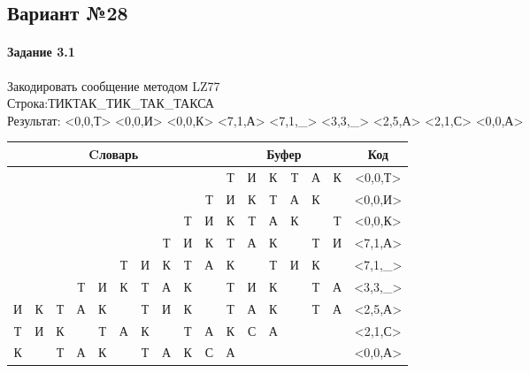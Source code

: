 \documentclass[a4paper, 12pt]{article}
\begin{document}
\pagebreak
\subsection{Вариант №28}
\paragraph{Задание 3.1}

Закодировать сообщение методом LZ77\\
Строка:ТИКТАК\_ТИК\_ТАК\_ТАКСА\\
Результат: <0,0,Т> <0,0,И> <0,0,К> <7,1,А> <7,1,\_> <3,3,\_> <2,5,А> <2,1,С> <0,0,А>\\
\begin{table}[h!]
\centering
\begin{tabular}{|c|c|c|c|c|c|c|c|c|c|c|c|c|c|c|c|c|} 
\hline
\multicolumn{10}{|c|}{Cловарь} & \multicolumn{6}{c|}{Буфер} & Код  \\ \hline
  &   &   &   &   &   &   &   &   &   & \cellcolor[HTML]{8CE4F6} Т & И & К & Т & А & К & <0,0,Т>
\\ \hline
  &   &   &   &   &   &   &   &   & Т & \cellcolor[HTML]{8CE4F6} И & К & Т & А & К &   & <0,0,И>
\\ \hline
  &   &   &   &   &   &   &   & Т & И & \cellcolor[HTML]{8CE4F6} К & Т & А & К &   & Т & <0,0,К>
\\ \hline
  &   &   &   &   &   &   & \cellcolor[HTML]{FFFF00} Т & И & К & \cellcolor[HTML]{FFFF00} Т & \cellcolor[HTML]{8CE4F6} А & К &   & Т & И & <7,1,А>
\\ \hline
  &   &   &   &   & Т & И & \cellcolor[HTML]{FFFF00} К & Т & А & \cellcolor[HTML]{FFFF00} К & \cellcolor[HTML]{8CE4F6}   & Т & И & К &   & <7,1,\_>
\\ \hline
  &   &   & \cellcolor[HTML]{FFFF00} Т & \cellcolor[HTML]{FFFF00} И & \cellcolor[HTML]{FFFF00} К & Т & А & К &   & \cellcolor[HTML]{FFFF00} Т & \cellcolor[HTML]{FFFF00} И & \cellcolor[HTML]{FFFF00} К & \cellcolor[HTML]{8CE4F6}   & Т & А & <3,3,\_>
\\ \hline
И & К & \cellcolor[HTML]{FFFF00} Т & \cellcolor[HTML]{FFFF00} А & \cellcolor[HTML]{FFFF00} К & \cellcolor[HTML]{FFFF00}   & \cellcolor[HTML]{FFFF00} Т & И & К &   & \cellcolor[HTML]{FFFF00} Т & \cellcolor[HTML]{FFFF00} А & \cellcolor[HTML]{FFFF00} К & \cellcolor[HTML]{FFFF00}   & \cellcolor[HTML]{FFFF00} Т & \cellcolor[HTML]{8CE4F6} А & <2,5,А>
\\ \hline
Т & И & \cellcolor[HTML]{FFFF00} К &   & Т & А & К &   & Т & А & \cellcolor[HTML]{FFFF00} К & \cellcolor[HTML]{8CE4F6} С & А &   &   &   & <2,1,С>
\\ \hline
К &   & Т & А & К &   & Т & А & К & С & \cellcolor[HTML]{8CE4F6} А &   &   &   &   &   & <0,0,А>
\\ \hline
\end{tabular}
\end{table}
\end{document}
